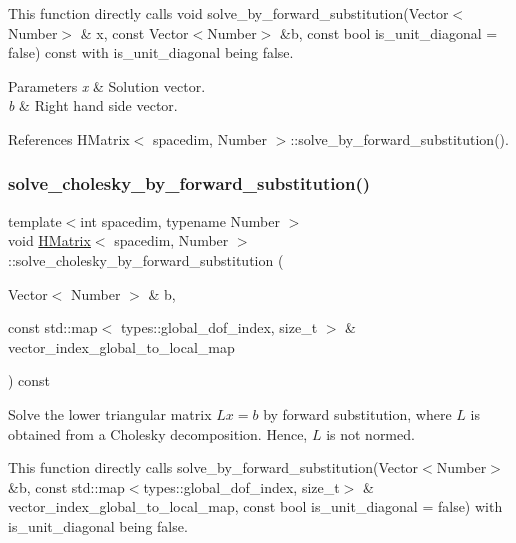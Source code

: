 This function directly calls {\ttfamily void} solve\+\_\+by\+\_\+forward\+\_\+substitution(Vector$<$\+Number$>$ \& x, const Vector$<$\+Number$>$ \&b, const bool is\+\_\+unit\+\_\+diagonal = false) const with {\ttfamily is\+\_\+unit\+\_\+diagonal} being {\ttfamily false}.


\begin{DoxyParams}{Parameters}
{\em x} & Solution vector. \\
\hline
{\em b} & Right hand side vector. \\
\hline
\end{DoxyParams}


References H\+Matrix$<$ spacedim, Number $>$\+::solve\+\_\+by\+\_\+forward\+\_\+substitution().

\mbox{\label{classHMatrix_a987af3012854b397b90f19f742085155}} 
\subsubsection{\texorpdfstring{solve\+\_\+cholesky\+\_\+by\+\_\+forward\+\_\+substitution()}{solve\_cholesky\_by\_forward\_substitution()}\hspace{0.1cm}{\footnotesize\ttfamily [3/4]}}
{\footnotesize\ttfamily template$<$int spacedim, typename Number $>$ \\
void \hyperlink{classHMatrix}{H\+Matrix}$<$ spacedim, Number $>$\+::solve\+\_\+cholesky\+\_\+by\+\_\+forward\+\_\+substitution (\begin{DoxyParamCaption}\item[{Vector$<$ Number $>$ \&}]{b,  }\item[{const std\+::map$<$ types\+::global\+\_\+dof\+\_\+index, size\+\_\+t $>$ \&}]{vector\+\_\+index\+\_\+global\+\_\+to\+\_\+local\+\_\+map }\end{DoxyParamCaption}) const}

Solve the lower triangular matrix $Lx=b$ by forward substitution, where $L$ is obtained from a Cholesky decomposition. Hence, $L$ is not normed.

This function directly calls {\ttfamily solve\+\_\+by\+\_\+forward\+\_\+substitution}(Vector$<$\+Number$>$ \&b, const std\+::map$<$types\+::global\+\_\+dof\+\_\+index, size\+\_\+t$>$ \& vector\+\_\+index\+\_\+global\+\_\+to\+\_\+local\+\_\+map, const bool is\+\_\+unit\+\_\+diagonal = false) with {\ttfamily is\+\_\+unit\+\_\+diagonal} being {\ttfamily false}.


